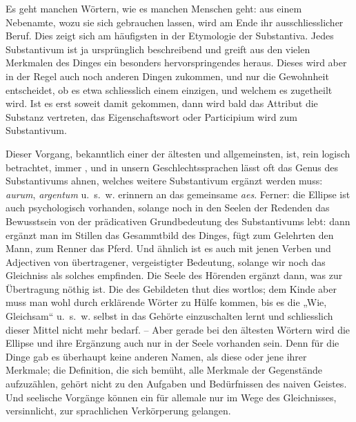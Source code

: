 {Es geht manchen Wörtern, wie es manchen Menschen geht: aus einem Nebenamte, wozu sie sich gebrauchen lassen, wird am Ende ihr ausschliesslicher Beruf. Dies zeigt sich am häufigsten in der Etymologie der Substantiva.  Jedes Substantivum ist ja ursprünglich beschreibend und greift aus den vielen Merkmalen des Dinges ein besonders hervorspringendes heraus. Dieses wird aber in der Regel auch noch anderen Dingen zukommen, und nur die Gewohnheit entscheidet, ob es etwa schliesslich einem einzigen, und welchem es zugetheilt wird. Ist es erst soweit damit gekommen, dann wird bald das Attribut die Substanz vertreten, das Eigenschaftswort oder Participium wird zum Substantivum.

Dieser Vorgang, bekanntlich einer der ältesten und allgemeinsten, ist, rein logisch betrachtet, immer , und in unsern Geschlechtssprachen lässt oft das Genus des Substantivums ahnen, welches weitere Substantivum ergänzt werden muss: \textit{aurum}, \textit{argentum} u.~s.~w. erinnern an das gemeinsame \textit{aes}. Ferner: die Ellipse ist auch psychologisch vorhanden, solange noch in den Seelen der Redenden das Bewusstsein von der prädicativen Grundbedeutung des Substantivums lebt: dann ergänzt man im Stillen das Gesammtbild des Dinges, fügt zum Gelehrten den Mann, zum Renner das Pferd. Und ähnlich ist es auch mit jenen \label{fp.236} Verben und Adjectiven von übertragener, vergeistigter Bedeutung, solange wir noch das Gleichniss als solches empfinden. Die Seele des Hörenden ergänzt dann, was zur Übertragung nöthig ist. Die des Gebildeten thut dies wortlos; dem Kinde aber muss man wohl durch erklärende Wörter zu Hülfe kommen, bis es die „Wie, Gleichsam“ u.~s.~w. selbst in das Gehörte einzuschalten lernt und schliesslich dieser Mittel nicht mehr bedarf. – Aber gerade bei den ältesten Wörtern wird die Ellipse und ihre Ergänzung auch nur in der Seele vorhanden sein. Denn für die Dinge gab es überhaupt keine anderen Namen, als diese oder jene ihrer Merkmale; die Definition, die sich bemüht, alle Merkmale der Gegenstände aufzuzählen, gehört nicht zu den Aufgaben und Bedürfnissen des naiven Geistes. Und seelische Vorgänge können ein für allemale nur im Wege des Gleichnisses, versinnlicht, zur sprachlichen Verkörperung gelangen.

\label{sp.238}

}
